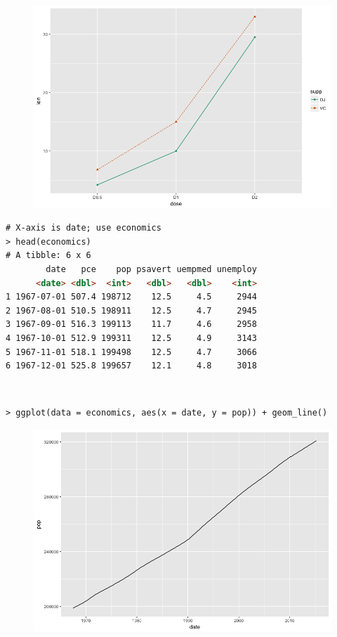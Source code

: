 \begin{figure}[H]\begin{center}\includegraphics[scale=1 ]{ilu/bg124.png}\end{center}\end{figure}
\begin{lstlisting}[language=html]
# X-axis is date; use economics
> head(economics)
# A tibble: 6 x 6
        date   pce    pop psavert uempmed unemploy
      <date> <dbl>  <int>   <dbl>   <dbl>    <int>
1 1967-07-01 507.4 198712    12.5     4.5     2944
2 1967-08-01 510.5 198911    12.5     4.7     2945
3 1967-09-01 516.3 199113    11.7     4.6     2958
4 1967-10-01 512.9 199311    12.5     4.9     3143
5 1967-11-01 518.1 199498    12.5     4.7     3066
6 1967-12-01 525.8 199657    12.1     4.8     3018
\end{lstlisting}
\textcolor{white}{.}\newline
\begin{lstlisting}[language=html]
> ggplot(data = economics, aes(x = date, y = pop)) + geom_line()
\end{lstlisting}
\begin{figure}[H]\begin{center}\includegraphics[scale=1 ]{ilu/bg125.png}\end{center}\end{figure}
